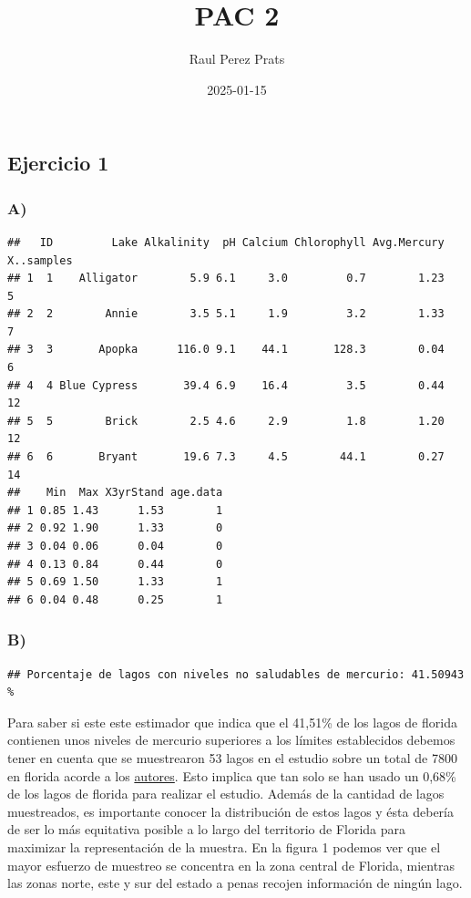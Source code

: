 \documentclass[
]{article}
\title{PAC 2}
\author{Raul Perez Prats}
\date{2025-01-15}
\begin{document}
\maketitle

\hypertarget{ejercicio-1}{%
\subsection{Ejercicio 1}\label{ejercicio-1}}

\hypertarget{a}{%
\subsubsection{A)}\label{a}}

\begin{verbatim}
##   ID         Lake Alkalinity  pH Calcium Chlorophyll Avg.Mercury X..samples
## 1  1    Alligator        5.9 6.1     3.0         0.7        1.23          5
## 2  2        Annie        3.5 5.1     1.9         3.2        1.33          7
## 3  3       Apopka      116.0 9.1    44.1       128.3        0.04          6
## 4  4 Blue Cypress       39.4 6.9    16.4         3.5        0.44         12
## 5  5        Brick        2.5 4.6     2.9         1.8        1.20         12
## 6  6       Bryant       19.6 7.3     4.5        44.1        0.27         14
##    Min  Max X3yrStand age.data
## 1 0.85 1.43      1.53        1
## 2 0.92 1.90      1.33        0
## 3 0.04 0.06      0.04        0
## 4 0.13 0.84      0.44        0
## 5 0.69 1.50      1.33        1
## 6 0.04 0.48      0.25        1
\end{verbatim}

\hypertarget{b}{%
\subsubsection{B)}\label{b}}

\begin{verbatim}
## Porcentaje de lagos con niveles no saludables de mercurio: 41.50943 %
\end{verbatim}

Para saber si este este estimador que indica que el 41,51\% de los lagos
de florida contienen unos niveles de mercurio superiores a los límites
establecidos debemos tener en cuenta que se muestrearon 53 lagos en el
estudio sobre un total de 7800 en florida acorde a los
\href{https://bcs.whfreeman.com/WebPub/Statistics/shared_resources/EESEE/MercuryinFloridasBass/index.html}{autores}.
Esto implica que tan solo se han usado un 0,68\% de los lagos de florida
para realizar el estudio. Además de la cantidad de lagos muestreados, es
importante conocer la distribución de estos lagos y ésta debería de ser
lo más equitativa posible a lo largo del territorio de Florida para
maximizar la representación de la muestra. En la figura 1 podemos ver
que el mayor esfuerzo de muestreo se concentra en la zona central de
Florida, mientras las zonas norte, este y sur del estado a penas recojen
información de ningún lago.
\end{document}
